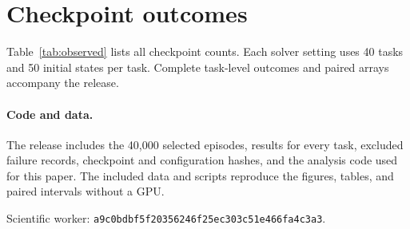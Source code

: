 \documentclass[10pt]{article}
\begin{document}
\appendix
\section{Checkpoint outcomes}
Table~\ref{tab:observed} lists all checkpoint counts. Each solver setting uses 40 tasks and 50 initial states per task. Complete task-level outcomes and paired arrays accompany the release.
\label{app:counts}


\paragraph{Code and data.}
The release includes the 40,000 selected episodes, results for every task, excluded failure records, checkpoint and configuration hashes, and the analysis code used for this paper. The included data and scripts reproduce the figures, tables, and paired intervals without a GPU.

Scientific worker: \texttt{a9c0bdbf5f20356246f25ec303c51e466fa4c3a3}.

\begingroup\footnotesize\setlength{\parskip}{0pt}\setlength{\bibsep}{3pt plus 1pt minus 1pt}


\endgroup
\end{document}
